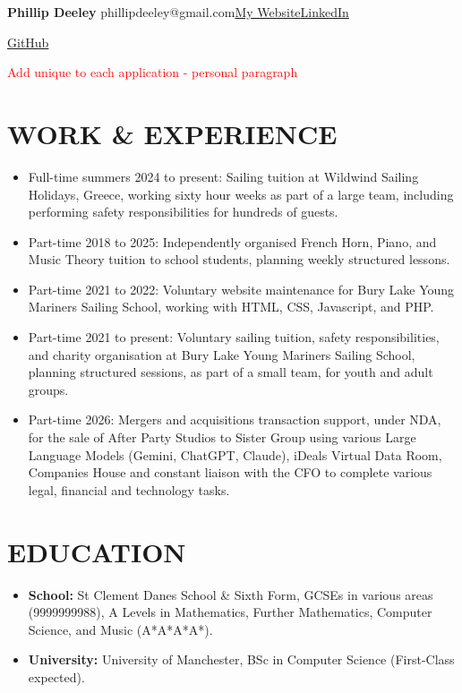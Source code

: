 \documentclass[paper=a4,fontsize=11pt]{scrartcl}
\newcommand{\bulletpoint}{
{\large $\triangleright$}
}
\newcommand{\sepspace}{\vspace*{0.3em}}
\newcommand{\PersonalInfo}[5]{
        \Huge \usefont{OT1}{phv}{m}{n} \textbf{#1} 
        \large \usefont{OT1}{phv}{m}{n} \hfill #2\hspace{10pt}#3\hspace{10pt}#4
}
\newcommand{\NewPart}[1]{%
  \vspace{-0.6em}%
  \section*{\uppercase{#1}}%
  \vspace{-0.4em}%
}
\begin{document}
\PersonalInfo{Phillip Deeley}
{phillipdeeley@gmail.com}
{\href{https://www.phillipdeeley.com}{My Website}}
{\href{https://www.linkedin.com/in/phillip-deeley/}{LinkedIn}}
{\href{}{}}
{\href{https://github.com/pdeeley3}{GitHub}}
\sepspace

\Text \textcolor{red} {{Add unique to each application - personal paragraph}}

\NewPart{Work \& Experience}
\begin{itemize}
    \item[\bulletpoint] Full-time summers 2024 to present: Sailing tuition at Wildwind Sailing Holidays, Greece, working sixty hour weeks as part of a large team, including performing safety responsibilities for hundreds of guests.
    \item[\bulletpoint] Part-time 2018 to 2025: Independently organised French Horn, Piano, and Music Theory tuition to school students, planning weekly structured lessons.
    \item[\bulletpoint] Part-time 2021 to 2022: Voluntary website maintenance for Bury Lake Young Mariners Sailing School, working with HTML, CSS, Javascript, and PHP.
    \item[\bulletpoint] Part-time 2021 to present: Voluntary sailing tuition, safety responsibilities, and charity organisation at Bury Lake Young Mariners Sailing School, planning structured sessions, as part of a small team, for youth and adult groups.
    \item[\bulletpoint] Part-time 2026: Mergers and acquisitions transaction support, under NDA, for the sale of After Party Studios to Sister Group using various Large Language Models (Gemini, ChatGPT, Claude), iDeals Virtual Data Room, Companies House and constant liaison with the CFO to complete various legal, financial and technology tasks.
\end{itemize}
\sepspace

\NewPart{Education}
\begin{itemize}
    \item[\bulletpoint] \textbf{School:} St Clement Danes School \& Sixth Form, GCSEs in various areas (9999999988), A Levels in Mathematics, Further Mathematics, Computer Science, and Music (A*A*A*A*).
    \item[\bulletpoint] \textbf{University:} University of Manchester, BSc in Computer Science (First-Class expected). 
\end{itemize}
\sepspace
\end{document}
